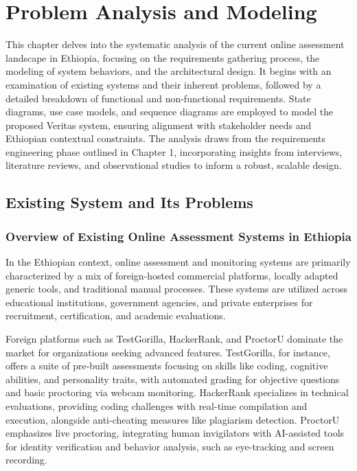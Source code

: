 \section{Problem Analysis and Modeling}
This chapter delves into the systematic analysis of the current online assessment landscape in Ethiopia, focusing on the requirements gathering process, the modeling of system behaviors, and the architectural design. It begins with an examination of existing systems and their inherent problems, followed by a detailed breakdown of functional and non-functional requirements. State diagrams, use case models, and sequence diagrams are employed to model the proposed Veritas system, ensuring alignment with stakeholder needs and Ethiopian contextual constraints. The analysis draws from the requirements engineering phase outlined in Chapter 1, incorporating insights from interviews, literature reviews, and observational studies to inform a robust, scalable design.

\subsection{Existing System and Its Problems}
\subsubsection{Overview of Existing Online Assessment Systems in Ethiopia}
In the Ethiopian context, online assessment and monitoring systems are primarily characterized by a mix of foreign-hosted commercial platforms, locally adapted generic tools, and traditional manual processes. These systems are utilized across educational institutions, government agencies, and private enterprises for recruitment, certification, and academic evaluations.

Foreign platforms such as TestGorilla, HackerRank, and ProctorU dominate the market for organizations seeking advanced features. TestGorilla, for instance, offers a suite of pre-built assessments focusing on skills like coding, cognitive abilities, and personality traits, with automated grading for objective questions and basic proctoring via webcam monitoring. HackerRank specializes in technical evaluations, providing coding challenges with real-time compilation and execution, alongside anti-cheating measures like plagiarism detection. ProctorU emphasizes live proctoring, integrating human invigilators with AI-assisted tools for identity verification and behavior analysis, such as eye-tracking and screen recording.

